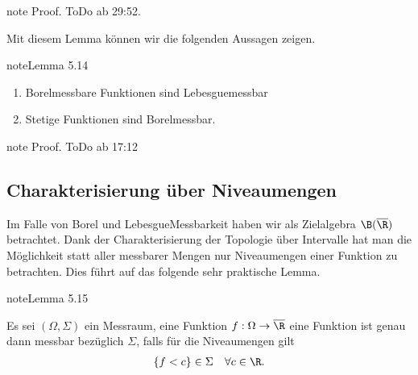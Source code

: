 \documentclass[letterpaper,10pt,german]{jupyterBook}
\begin{document}
\begin{sphinxadmonition}{note}
\sphinxAtStartPar
Proof. ToDo
 ab 29:52.
\end{sphinxadmonition}

\sphinxAtStartPar
Mit diesem Lemma können wir die folgenden Aussagen zeigen.
\label{masstheorie/lebesgue_integral:lemma-3}
\begin{sphinxadmonition}{note}{Lemma 5.14}


\begin{enumerate}
%
\item {} 
\sphinxAtStartPar
Borel\sphinxhyphen{}messbare Funktionen sind Lebesgue\sphinxhyphen{}messbar

\item {} 
\sphinxAtStartPar
Stetige Funktionen sind Borel\sphinxhyphen{}messbar.

\end{enumerate}
\end{sphinxadmonition}

\begin{sphinxadmonition}{note}
\sphinxAtStartPar
Proof. ToDo
 ab 17:12
\end{sphinxadmonition}


\subsection{Charakterisierung über Niveaumengen}
\label{\detokenize{masstheorie/lebesgue_integral:charakterisierung-uber-niveaumengen}}
\sphinxAtStartPar
Im Falle von Borel und Lebesgue\sphinxhyphen{}Messbarkeit haben wir als Zielalgebra \(\B(\overline{\R})\) betrachtet. Dank der Charakterisierung der Topologie über Intervalle hat man die Möglichkeit statt aller messbarer Mengen nur Niveaumengen einer Funktion zu betrachten. Dies führt auf das folgende sehr praktische Lemma.
\label{masstheorie/lebesgue_integral:lem:Niveaumengen}
\begin{sphinxadmonition}{note}{Lemma 5.15}



\sphinxAtStartPar
Es sei \((\Omega,\Sigma)\) ein Messraum, eine Funktion \(f:\Omega\to\overline{\R}\) eine Funktion ist genau dann messbar bezüglich \(\Sigma\), falls
für die Niveaumengen gilt
\begin{equation*}
\begin{split}\{f< c\}\in\Sigma\quad\forall c\in\R.\end{split}
\end{equation*}\end{sphinxadmonition}
\end{document}
